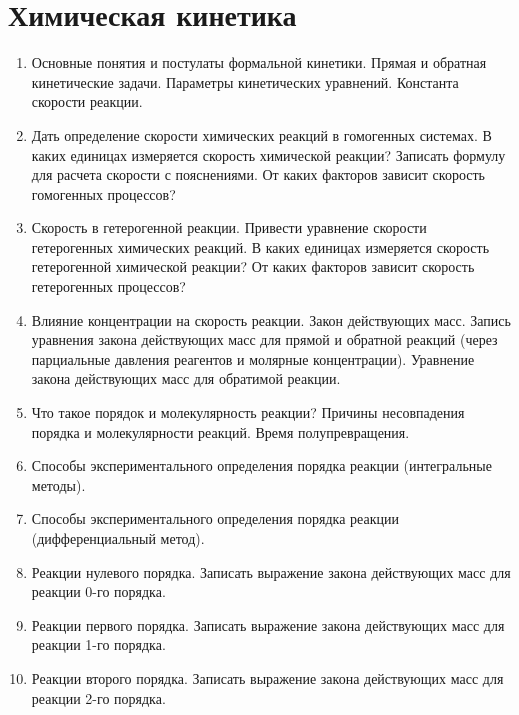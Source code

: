 %
%
\section{Химическая кинетика}
\begin{enumerate}
\item 
Основные понятия и постулаты формальной кинетики. Прямая и обратная кинетические задачи. Параметры кинетических уравнений. Константа скорости реакции.
 
\item 
Дать определение скорости химических реакций в  гомогенных системах. В каких единицах измеряется скорость химической реакции? Записать формулу для расчета скорости с пояснениями. От каких факторов зависит скорость гомогенных  процессов? 
 
\item
Скорость в гетерогенной реакции. Привести уравнение скорости гетерогенных химических реакций. В каких единицах измеряется скорость гетерогенной химической реакции? От каких факторов зависит скорость гетерогенных процессов? 
 
\item 
Влияние концентрации на скорость реакции. Закон действующих масс. Запись уравнения закона действующих масс для прямой и обратной реакций (через парциальные давления реагентов и молярные концентрации). Уравнение закона действующих масс для обратимой реакции.
 
\item
Что такое порядок и молекулярность реакции? Причины несовпадения порядка и молекулярности реакций. Время полупревращения.
 
\item
Способы экспериментального определения порядка реакции (интегральные методы).
 
\item 
Способы экспериментального определения порядка реакции (дифференциальный метод).
 
\item
Реакции нулевого порядка. Записать выражение закона действующих масс для реакции 0-го порядка. 
 
\item
Реакции первого порядка. Записать выражение закона действующих масс для реакции 1-го порядка.
 
\item 
Реакции второго порядка. Записать выражение закона действующих масс для реакции 2-го порядка. 
 

\end{enumerate}
